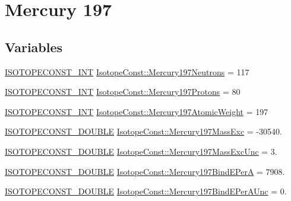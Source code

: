 \hypertarget{group___isotope_const-_mercury-_hg197}{}\section{Mercury 197}
\label{group___isotope_const-_mercury-_hg197}
\subsection*{Variables}
\begin{DoxyCompactItemize}
\item 
\mbox{\hyperlink{group___isotope_const-_macros_ga5f18360b3e99483a35c32d789e62621c}{I\+S\+O\+T\+O\+P\+E\+C\+O\+N\+S\+T\+\_\+\+I\+NT}} \mbox{\hyperlink{group___isotope_const-_mercury-_hg197_ga753c6da147aa9cf54c887604c99e5aae}{Isotope\+Const\+::\+Mercury197\+Neutrons}} = 117
\item 
\mbox{\hyperlink{group___isotope_const-_macros_ga5f18360b3e99483a35c32d789e62621c}{I\+S\+O\+T\+O\+P\+E\+C\+O\+N\+S\+T\+\_\+\+I\+NT}} \mbox{\hyperlink{group___isotope_const-_mercury-_hg197_ga94a920436dfee781868e2ed3e0e59f0d}{Isotope\+Const\+::\+Mercury197\+Protons}} = 80
\item 
\mbox{\hyperlink{group___isotope_const-_macros_ga5f18360b3e99483a35c32d789e62621c}{I\+S\+O\+T\+O\+P\+E\+C\+O\+N\+S\+T\+\_\+\+I\+NT}} \mbox{\hyperlink{group___isotope_const-_mercury-_hg197_gaeb85776a1aa99d17f6ea8bb05a5e7059}{Isotope\+Const\+::\+Mercury197\+Atomic\+Weight}} = 197
\item 
\mbox{\hyperlink{group___isotope_const-_macros_ga8f45a7272ce02c0b4c65c44636ed719a}{I\+S\+O\+T\+O\+P\+E\+C\+O\+N\+S\+T\+\_\+\+D\+O\+U\+B\+LE}} \mbox{\hyperlink{group___isotope_const-_mercury-_hg197_ga08284ece859a105977361634cb8ac9d0}{Isotope\+Const\+::\+Mercury197\+Mass\+Exc}} = -\/30540.
\item 
\mbox{\hyperlink{group___isotope_const-_macros_ga8f45a7272ce02c0b4c65c44636ed719a}{I\+S\+O\+T\+O\+P\+E\+C\+O\+N\+S\+T\+\_\+\+D\+O\+U\+B\+LE}} \mbox{\hyperlink{group___isotope_const-_mercury-_hg197_gaec5c87279016c292164503e4d79e257e}{Isotope\+Const\+::\+Mercury197\+Mass\+Exc\+Unc}} = 3.
\item 
\mbox{\hyperlink{group___isotope_const-_macros_ga8f45a7272ce02c0b4c65c44636ed719a}{I\+S\+O\+T\+O\+P\+E\+C\+O\+N\+S\+T\+\_\+\+D\+O\+U\+B\+LE}} \mbox{\hyperlink{group___isotope_const-_mercury-_hg197_gab9a16fbde5bd358f71085ee8c8d562d0}{Isotope\+Const\+::\+Mercury197\+Bind\+E\+PerA}} = 7908.
\item 
\mbox{\hyperlink{group___isotope_const-_macros_ga8f45a7272ce02c0b4c65c44636ed719a}{I\+S\+O\+T\+O\+P\+E\+C\+O\+N\+S\+T\+\_\+\+D\+O\+U\+B\+LE}} \mbox{\hyperlink{group___isotope_const-_mercury-_hg197_ga78a35919b8215b7ae2cc7b317404d200}{Isotope\+Const\+::\+Mercury197\+Bind\+E\+Per\+A\+Unc}} = 0.

\end{DoxyCompactItemize}
